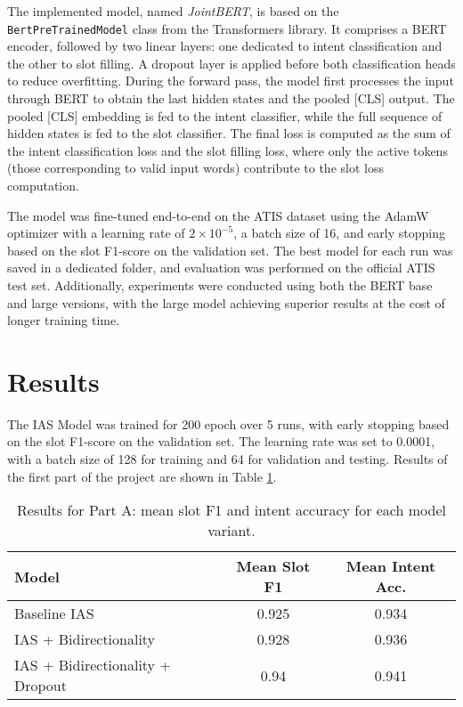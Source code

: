 \documentclass[a4paper]{article}
\begin{document}
 The implemented model, named \textit{JointBERT}, is based on the \texttt{BertPreTrainedModel} class from the Transformers library.
 It comprises a BERT encoder, followed by two linear layers: one dedicated to intent classification and the other to slot filling.
 A dropout layer is applied before both classification heads to reduce overfitting.
 During the forward pass, the model first processes the input through BERT to obtain the last hidden states and the pooled [CLS] output.
 The pooled [CLS] embedding is fed to the intent classifier, while the full sequence of hidden states is fed to the slot classifier.
 The final loss is computed as the sum of the intent classification loss and the slot filling loss, where only the active tokens (those corresponding to valid input words) contribute to the slot loss computation.
 
 The model was fine-tuned end-to-end on the ATIS dataset using the AdamW optimizer with a learning rate of $2 \times 10^{-5}$, a batch size of 16, and early stopping based on the slot F1-score on the validation set.
 The best model for each run was saved in a dedicated folder, and evaluation was performed on the official ATIS test set.
 Additionally, experiments were conducted using both the BERT base and large versions, with the large model achieving superior results at the cost of longer training time.


\section{Results}
The IAS Model was trained for 200 epoch over 5 runs, with early stopping based on the slot F1-score on the validation set.
The learning rate was set to 0.0001, with a batch size of 128 for training and 64 for validation and testing. 
Results of the first part of the project are shown in Table \ref{tab:partAresults}.
\begin{table}[h!]
  \centering
  \begin{tabular}{lcc}
    \toprule
    \textbf{Model} & \textbf{Mean Slot F1} & \textbf{Mean Intent Acc.} \\
    \midrule
    Baseline IAS & 0.925 & 0.934 \\
    IAS + Bidirectionality & 0.928 & 0.936 \\
    IAS + Bidirectionality + Dropout & 0.94 & 0.941 \\ 
    \bottomrule
  \end{tabular}
  \caption{Results for Part A: mean slot F1 and intent accuracy for each model variant.}
  \label{tab:partAresults}
\end{table}
\end{document}
